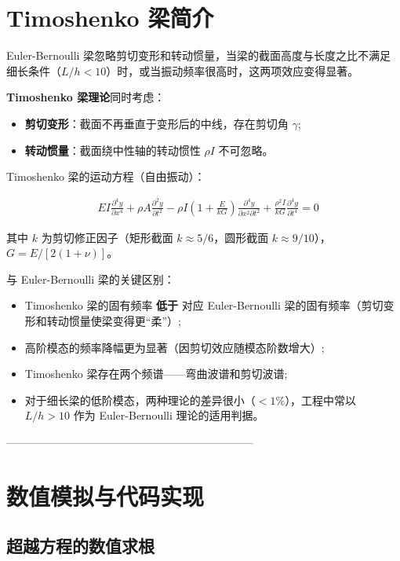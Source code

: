 \section{Timoshenko 梁简介}

Euler-Bernoulli 梁忽略剪切变形和转动惯量，当梁的截面高度与长度之比不满足细长条件（$L/h < 10$）时，或当振动频率很高时，这两项效应变得显著。

\textbf{Timoshenko 梁理论}同时考虑：
\begin{itemize}
    \item \textbf{剪切变形}：截面不再垂直于变形后的中线，存在剪切角 $\gamma$;
    \item \textbf{转动惯量}：截面绕中性轴的转动惯性 $\rho I$ 不可忽略。
\end{itemize}

Timoshenko 梁的运动方程（自由振动）：

\begin{myformula}
\[\begin{aligned}
& EI\frac{\partial^4 y}{\partial x^4} + \rho A\frac{\partial^2 y}{\partial t^2} - \rho I\left(1+\frac{E}{kG}\right)\frac{\partial^4 y}{\partial x^2\partial t^2} + \frac{\rho^2 I}{kG}\frac{\partial^4 y}{\partial t^4} = 0
\end{aligned}\]
\end{myformula}

其中 $k$ 为剪切修正因子（矩形截面 $k\approx 5/6$，圆形截面 $k\approx 9/10$），$G=E/[2(1+\nu)]$。

与 Euler-Bernoulli 梁的关键区别：
\begin{itemize}
    \item Timoshenko 梁的固有频率 \textbf{低于} 对应 Euler-Bernoulli 梁的固有频率（剪切变形和转动惯量使梁变得更``柔''）;
    \item 高阶模态的频率降幅更为显著（因剪切效应随模态阶数增大）;
    \item Timoshenko 梁存在两个频谱——弯曲波谱和剪切波谱;
    \item 对于细长梁的低阶模态，两种理论的差异很小（$<1\%$），工程中常以 $L/h > 10$ 作为 Euler-Bernoulli 理论的适用判据。
\end{itemize}

--------------------------------------------------------------------
\section{数值模拟与代码实现}

\subsection{超越方程的数值求根}

